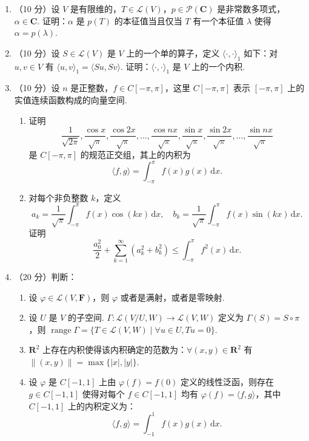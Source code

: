 \begin{enumerate}
    \item （10 分）设 \(V\) 是有限维的，\(T\in \mathcal{L}(V)\)，\(p\in \mathcal{P}(\mathbf{C})\) 是非常数多项式，\(\alpha \in \mathbf{C}\). 证明：\(\alpha\) 是 \(p(T)\) 的本征值当且仅当 \(T\) 有一个本征值 \(\lambda\) 使得 \(\alpha = p(\lambda)\).

    \item （10 分）设 \(S\in \mathcal{L}(V)\) 是 \(V\) 上的一个单的算子，定义 \(\langle\cdot,\cdot\rangle_1\) 如下：对 \(u,v\in V\) 有 \(\langle u,v\rangle_1 = \langle Su,Sv\rangle\). 证明：\(\langle\cdot,\cdot\rangle_1\) 是 \(V\) 上的一个内积.

    \item （10 分）设 \(n\) 是正整数，\(f\in C[-\pi,\pi]\)，这里 \(C[-\pi,\pi]\) 表示 \([-\pi,\pi]\) 上的实值连续函数构成的向量空间.

    \begin{enumerate}
        \item 证明
        \[\frac{1}{\sqrt{2\pi}},\frac{\cos x}{\sqrt{\pi}},\frac{\cos2x}{\sqrt{\pi}},\ldots,\frac{\cos nx}{\sqrt{\pi}},\frac{\sin x}{\sqrt{\pi}},\frac{\sin2x}{\sqrt{\pi}},\ldots,\frac{\sin nx}{\sqrt{\pi}}\]
        是 \(C[-\pi,\pi]\) 的规范正交组，其上的内积为
        \[ \langle f,g\rangle=\int_{-\pi}^\pi f(x)g(x)\,\mathrm{d}x. \]

        \item 对每个非负整数 \(k\)，定义 \[a_k = \dfrac{1}{\sqrt{\pi}}\int^{\pi}_{-\pi}f(x)\cos (kx)\,\mathrm{d}x,\quad b_k = \dfrac{1}{\sqrt{\pi}}\int^{\pi}_{-\pi}f(x)\sin (kx)\,\mathrm{d}x.\]
        证明
        \[\dfrac{a_0^2}{2}+\sum\limits_{k=1}^{\infty}(a_k^2+b_k^2) \leqslant \int_{-\pi}^{\pi}f^2(x)\,\mathrm{d}x.\]
    \end{enumerate}

    \item （20 分）判断：
    \begin{enumerate}
        \item 设 \(\varphi \in \mathcal{L}(V,\mathbf{F})\)，则 \(\varphi\) 或者是满射，或者是零映射.

        \item 设 $U$ 是 $V$ 的子空间. $\Gamma\colon\mathcal{L}(V/U,W)\to\mathcal{L}(V,W)$ 定义为 $\Gamma(S)=S\circ\pi$，则 \(\operatorname{range}\Gamma=\{T\in\mathcal{L}(V,W) \mid \forall u\in U , Tu=0\}\).

        \item $\mathbf{R}^2$ 上存在内积使得该内积确定的范数为：$\forall (x,y)\in\mathbf{R}^2$ 有 $\|(x,y)\|=\max\{|x|,|y|\}.$

        \item
        设 $\varphi$ 是 $C[-1,1]$ 上由 $\varphi(f)=f(0)$ 定义的线性泛函，则存在 $g\in C[-1,1]$ 使得对每个 $f\in C[-1,1]$ 均有 $\varphi(f)=\langle f,g\rangle$，其中 $C[-1,1]$ 上的内积定义为：
        \[\langle f,g\rangle=\int_{-1}^1f(x)g(x)\,\mathrm{d}x.\]
    \end{enumerate}

\end{enumerate}

\clearpage

